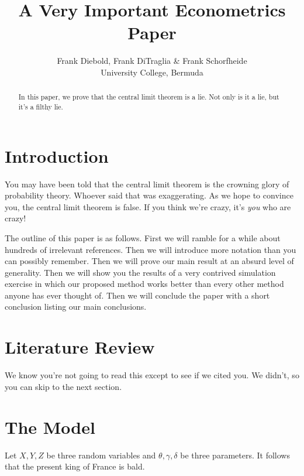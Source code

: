 \documentclass[12pt,letterpaper]{article}
\title{A Very Important Econometrics Paper}
\author{Frank Diebold, Frank DiTraglia \& Frank Schorfheide \\ University College, Bermuda}
\begin{document}
\maketitle

\begin{abstract}
	In this paper, we prove that the central limit theorem is a lie. 
	Not only is it a lie, but it's a filthy lie.
\end{abstract}

\section{Introduction}
You may have been told that the central limit theorem is the crowning glory of probability theory.
Whoever said that was exaggerating.
As we hope to convince you, the central limit theorem is false.
If you think we're crazy, it's \emph{you} who are crazy!

The outline of this paper is as follows.
First we will ramble for a while about hundreds of irrelevant references.
Then we will introduce more notation than you can possibly remember.
Then we will prove our main result at an absurd level of generality.
Then we will show you the results of a very contrived simulation exercise in which our proposed method works better than every other method anyone has ever thought of.
Then we will conclude the paper with a short conclusion listing our main conclusions.

\section{Literature Review}
We know you're not going to read this except to see if we cited you.
We didn't, so you can skip to the next section.

\section{The Model}
Let $X,Y,Z$ be three random variables and $\theta, \gamma, \delta$ be three parameters.
It follows that the present king of France is bald. 
\end{document}
